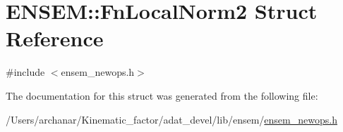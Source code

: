 \hypertarget{structENSEM_1_1FnLocalNorm2}{}\section{E\+N\+S\+EM\+:\+:Fn\+Local\+Norm2 Struct Reference}
\label{structENSEM_1_1FnLocalNorm2}


{\ttfamily \#include $<$ensem\+\_\+newops.\+h$>$}



The documentation for this struct was generated from the following file\+:\begin{DoxyCompactItemize}
\item 
/\+Users/archanar/\+Kinematic\+\_\+factor/adat\+\_\+devel/lib/ensem/\mbox{\hyperlink{lib_2ensem_2ensem__newops_8h}{ensem\+\_\+newops.\+h}}\end{DoxyCompactItemize}
